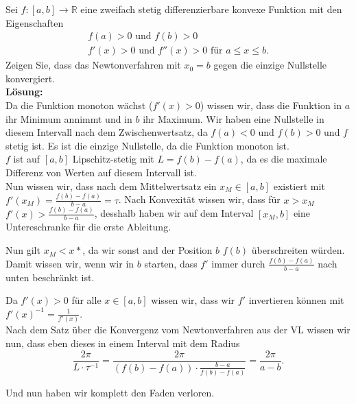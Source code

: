 \documentclass[11pt,a4paper,ngerman]{article}
\begin{document}
Sei $f : [a,b] \rightarrow \mathbb{R}$ eine zweifach stetig differenzierbare konvexe Funktion mit den Eigenschaften
$$\begin{array}{l}
    f(a) > 0 \text{ und } f(b) > 0\\
    f'(x) > 0 \text{ und } f''(x) > 0 \text{ für }a \leq x \leq b.
\end{array}$$
Zeigen Sie, dass das Newtonverfahren mit $x_0 = b$ gegen die einzige Nullstelle konvergiert.\\

\textbf{Lösung:}\\
Da die Funktion monoton wächst ($f'(x) > 0$) wissen wir, dass die Funktion in $a$ ihr Minimum annimmt und in $b$ ihr Maximum.
Wir haben eine Nullstelle in diesem Intervall nach dem Zwischenwertsatz, da $f(a)<0$ und $f(b) > 0$ und $f$ stetig ist.
Es ist die einzige Nullstelle, da die Funktion monoton ist.\\

$f$ ist auf $[a,b]$ Lipschitz-stetig mit $L = f(b) - f(a)$, da es die maximale Differenz von Werten auf diesem Intervall ist.\\

Nun wissen wir, dass nach dem Mittelwertsatz ein $x_M \in [a,b]$ existiert mit $f'(x_M) = \frac{f(b) - f(a)}{b - a} = \tau$.
Nach Konvexität wissen wir, dass für $x > x_M$ $f'(x) > \frac{f(b) - f(a)}{b-a}$, desshalb haben wir auf dem Interval
$[x_M,b]$ eine Untereschranke für die erste Ableitung.

Nun gilt $x_M < x*$, da wir sonst and der Position $b$ $f(b)$ überschreiten würden. Damit wissen wir, wenn wir in $b$ starten,
dass $f'$ immer durch $\frac{f(b) - f(a)}{b-a}$ nach unten beschränkt ist.

Da $f'(x) > 0$ für alle $x \in [a,b]$ wissen wir, dass wir $f'$ invertieren können mit $f'(x)^{-1} = \frac{1}{f'(x)}$.\\

Nach dem Satz über die Konvergenz vom Newtonverfahren aus der VL wissen wir nun, dass eben dieses in einem Interval mit dem Radius
$$
    \frac{2\pi}{L \cdot \tau^{-1}} = \frac{2\pi}{(f(b)-f(a))\cdot\frac{b-a}{f(b) - f(a)}} = \frac{2\pi}{a-b}.
$$

Und nun haben wir komplett den Faden verloren.

\label{LastPage}
\end{document}
